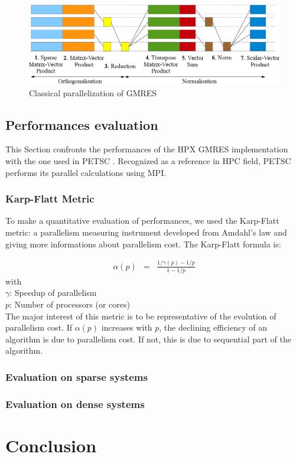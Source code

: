\documentclass[conference]{acmsig-alternate-10pt}
\begin{document}
\begin{figure}[h]
\begin{center}
\includegraphics[scale=0.33]{Images/Im6.png}
\end{center}
\caption{Classical parallelization of GMRES}
\label{pargmres}
\end{figure}

\subsection{Performances evaluation}
This Section confronts the performances of the HPX GMRES implementation with the one used in PETSC \cite{Petsc}. Recognized as a reference in HPC field, PETSC performs its parallel calculations using MPI.

\subsubsection{Karp-Flatt Metric}
To make a quantitative evaluation of performances, we used the Karp-Flatt metric: a parallelism measuring instrument developed from Amdahl's law and giving more informations about parallelism cost. The Karp-Flatt formula is:

\begin{eqnarray}
\alpha(p) &=&\frac{1/\gamma(p) - 1/p}{1-1/p} \label{KarpFlatt}
\end{eqnarray}
with\\
$\gamma$: Speedup of parallelism\\
$p$: Number of processors (or cores)\\

The major interest of this metric is to be representative of the evolution of parallelism cost. If $\alpha(p)$ increases with $p$, the declining efficiency of an algorithm is due to parallelism cost. If not, this is due to sequential part of the algorithm.

\subsubsection{Evaluation on sparse systems}
\subsubsection{Evaluation on dense systems}

\section{Conclusion}



\end{document}
